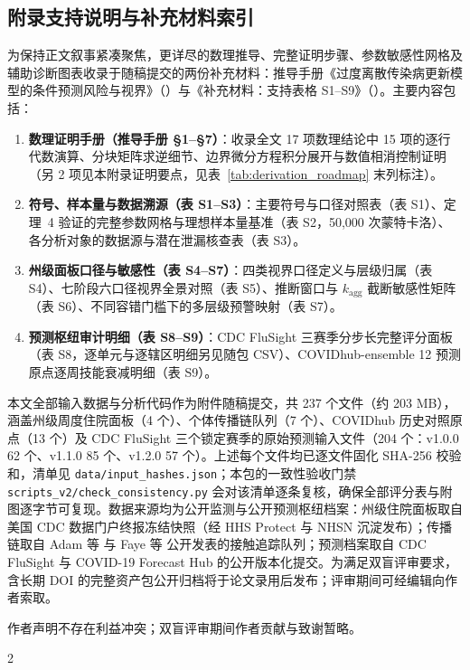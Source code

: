 \documentclass[11pt,a4paper]{article}
\theoremstyle{plain}
\theoremstyle{definition}
\begin{document}
{\subsection*{附录支持说明与补充材料索引}

为保持正文叙事紧凑聚焦，更详尽的数理推导、完整证明步骤、参数敏感性网格及辅助诊断图表收录于随稿提交的两份补充材料：推导手册《过度离散传染病更新模型的条件预测风险与视界》（）与《补充材料：支持表格 S1--S9》（）。主要内容包括：
\begin{enumerate}[itemsep=0.2pt,topsep=0.5pt,parsep=0pt]
\item \textbf{数理证明手册（推导手册 §1--§7）}：收录全文 17 项数理结论中 15 项的逐行代数演算、分块矩阵求逆细节、边界微分方程积分展开与数值相消控制证明（另 2 项见本附录证明要点，见表~\ref{tab:derivation_roadmap} 末列标注）。
\item \textbf{符号、样本量与数据溯源（表 S1--S3）}：主要符号与口径对照表（表 S1）、定理~4 验证的完整参数网格与理想样本量基准（表 S2，50{,}000 次蒙特卡洛）、各分析对象的数据源与潜在泄漏核查表（表 S3）。
\item \textbf{州级面板口径与敏感性（表 S4--S7）}：四类视界口径定义与层级归属（表 S4）、七阶段六口径视界全景对照（表 S5）、推断窗口与 $k_{\text{agg}}$ 截断敏感性矩阵（表 S6）、不同容错门槛下的多层级预警映射（表 S7）。
\item \textbf{预测枢纽审计明细（表 S8--S9）}：CDC FluSight 三赛季分步长完整评分面板（表 S8，逐单元与逐辖区明细另见随包 CSV）、COVIDhub-ensemble 12 预测原点逐周技能衰减明细（表 S9）。
\end{enumerate}

 本文全部输入数据与分析代码作为附件随稿提交，共 237 个文件（约 203 MB），涵盖州级周度住院面板（4 个）、个体传播链队列（7 个）、COVIDhub 历史对照原点（13 个）及 CDC FluSight 三个锁定赛季的原始预测输入文件（204 个：v1.0.0 62 个、v1.1.0 85 个、v1.2.0 57 个）。上述每个文件均已逐文件固化 SHA-256 校验和，清单见 \texttt{data/input\_hashes.json}；本包的一致性验收门禁 \texttt{scripts\_v2/check\_consistency.py} 会对该清单逐条复核，确保全部评分表与附图逐字节可复现。数据来源均为公开监测与公开预测枢纽档案：州级住院面板取自美国 CDC 数据门户终报冻结快照（经 HHS Protect 与 NHSN 沉淀发布）；传播链取自 Adam 等\citep{adam2020clustering} 与 Faye 等\citep{faye2015chains} 公开发表的接触追踪队列；预测档案取自 CDC FluSight 与 COVID-19 Forecast Hub 的公开版本化提交。为满足双盲评审要求，含长期 DOI 的完整资产包公开归档将于论文录用后发布；评审期间可经编辑向作者索取。

\vspace{0.2em}
 作者声明不存在利益冲突；双盲评审期间作者贡献与致谢暂略。\par}

\clearpage
{}\vspace{0.1em}
\begin{multicols}{2}
{\fontsize{7.5pt}{9.0pt}\selectfont
\setlength{\bibsep}{1.0pt}
\renewcommand{\refname}{}
\vspace*{-2.0em}


}
\end{multicols}
\end{document}
